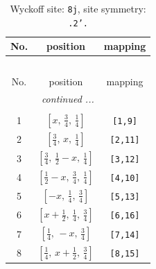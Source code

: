 \documentclass[fleqn,8pt]{jsarticle}
\begin{document}
\begin{longtable}{ccc}
\caption{Wyckoff site: {\tt 8j}, site symmetry: {\tt .2'.}}
 \\
 \hline \hline
No. & position & mapping \\ \hline \endfirsthead

\multicolumn{2}{l}{\tablename\ \thetable{}} \\
 \hline \hline
No. & position & mapping \\ \hline \endhead

 \hline \hline
\multicolumn{2}{r}{\footnotesize\it continued ...} \\ \endfoot

 \hline \hline
\multicolumn{2}{r}{} \\ \endlastfoot

1 & $\left[ x,\, \frac{3}{4},\, \frac{1}{4} \right]$ & {\tt [1,9]} \\ \hline
2 & $\left[ \frac{3}{4},\, x,\, \frac{1}{4} \right]$ & {\tt [2,11]} \\ \hline
3 & $\left[ \frac{3}{4},\, \frac{1}{2} - x,\, \frac{1}{4} \right]$ & {\tt [3,12]} \\ \hline
4 & $\left[ \frac{1}{2} - x,\, \frac{3}{4},\, \frac{1}{4} \right]$ & {\tt [4,10]} \\ \hline
5 & $\left[ - x,\, \frac{1}{4},\, \frac{3}{4} \right]$ & {\tt [5,13]} \\ \hline
6 & $\left[ x + \frac{1}{2},\, \frac{1}{4},\, \frac{3}{4} \right]$ & {\tt [6,16]} \\ \hline
7 & $\left[ \frac{1}{4},\, - x,\, \frac{3}{4} \right]$ & {\tt [7,14]} \\ \hline
8 & $\left[ \frac{1}{4},\, x + \frac{1}{2},\, \frac{3}{4} \right]$ & {\tt [8,15]} \\
\end{longtable}
\renewcommand{\arraystretch}{1.2}
\end{document}

